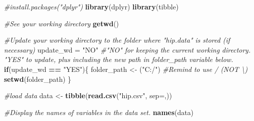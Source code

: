 \documentclass[
]{article}
\newenvironment{Shaded}{\begin{snugshade}}{\end{snugshade}}
\newcommand{\AttributeTok}[1]{\textcolor[rgb]{0.13,0.29,0.53}{#1}}
\newcommand{\CommentTok}[1]{\textcolor[rgb]{0.56,0.35,0.01}{\textit{#1}}}
\newcommand{\ControlFlowTok}[1]{\textcolor[rgb]{0.13,0.29,0.53}{\textbf{#1}}}
\newcommand{\FunctionTok}[1]{\textcolor[rgb]{0.13,0.29,0.53}{\textbf{#1}}}
\newcommand{\NormalTok}[1]{#1}
\newcommand{\OtherTok}[1]{\textcolor[rgb]{0.56,0.35,0.01}{#1}}
\newcommand{\SpecialCharTok}[1]{\textcolor[rgb]{0.81,0.36,0.00}{\textbf{#1}}}
\newcommand{\StringTok}[1]{\textcolor[rgb]{0.31,0.60,0.02}{#1}}
\begin{document}
\begin{Shaded}
\begin{Highlighting}[]
\CommentTok{\#install.packages("dplyr")}
\FunctionTok{library}\NormalTok{(dplyr)}
\FunctionTok{library}\NormalTok{(tibble)}

\CommentTok{\#See your working directory}
\FunctionTok{getwd}\NormalTok{()}

\CommentTok{\#Update your working directory to the folder where "hip.data" is stored (if necessary)}
\NormalTok{update\_wd }\OtherTok{=} \StringTok{"NO"} \CommentTok{\#"NO" for keeping the current working directory. "YES" to update, plus including the new path in folder\_path variable below.}
\ControlFlowTok{if}\NormalTok{(update\_wd }\SpecialCharTok{==} \StringTok{"YES"}\NormalTok{)\{}
\NormalTok{folder\_path }\OtherTok{\textless{}{-}}\NormalTok{ (}\StringTok{"C:/"}\NormalTok{)  }\CommentTok{\#Remind to use / (NOT \textbackslash{})}
\FunctionTok{setwd}\NormalTok{(folder\_path)}
\NormalTok{\}}

\CommentTok{\#load data}
\NormalTok{data }\OtherTok{\textless{}{-}} \FunctionTok{tibble}\NormalTok{(}\FunctionTok{read.csv}\NormalTok{(}\StringTok{"hip.csv"}\NormalTok{, }\AttributeTok{sep=}\StringTok{\textquotesingle{},\textquotesingle{}}\NormalTok{))}


\CommentTok{\#Display the names of variables in the data set.}
\FunctionTok{names}\NormalTok{(data)}


\end{Highlighting}
\end{Shaded}
\end{document}
